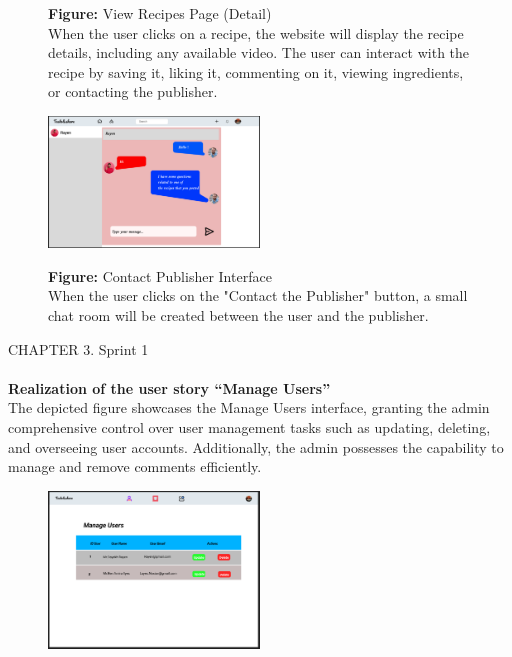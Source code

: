 \documentclass{article}
\begin{document}
{{{{{{{{\begin{figure}[htbp]
    \textbf{Figure:} View Recipes Page (Detail) \\
    When the user clicks on a recipe, the website will display the recipe details, including any available video. The user can interact with the recipe by saving it, liking it, commenting on it, viewing ingredients, or contacting the publisher.
\end{figure}

\begin{figure}[htbp]
    \centering
    \includegraphics[width=0.5\textwidth]{Contact} 
    \vspace{0.5cm}
    
    \textbf{Figure:} Contact Publisher Interface \\
    When the user clicks on the "Contact the Publisher" button, a small chat room will be created between the user and the publisher.
\end{figure}
\newpage
\noindent
CHAPTER 3.  Sprint 1 \\
\underline{\hspace{\textwidth}} \vspace{0.2cm}
\\\textbf{Realization of the user story “Manage Users”}\\
The depicted figure showcases the Manage Users interface, granting the admin comprehensive control over user management tasks such as updating, deleting, and overseeing user accounts. Additionally, the admin possesses the capability to manage and remove comments efficiently.\\
\begin{figure}[htbp]
    \centering
    \includegraphics[width=0.5\textwidth]{ManageUser} 
    \vspace{0.5cm}
    

\end{figure}}}}}}}}}
\end{document}
